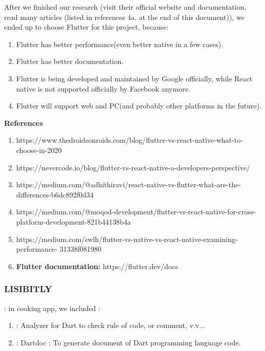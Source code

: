 \documentclass{article}
\begin{document}
After we finished our research (visit their official website and documentation, read many articles (listed in references 4a. at the end of this document)), we ended up to choose Flutter for this project, because:
\begin{enumerate}
        \item Flutter has better performance(even better native in a few cases).
        \item Flutter has better documentation.
        \item Flutter is being developed and maintained by Google officially, while React native is not supported officially by Facebook anymore.
        \item Flutter will support web and PC(and probably other platforms in the future). 
\end{enumerate}

\textbf{References}
\begin{enumerate}
\item https://www.thedroidsonroids.com/blog/flutter-vs-react-native-what-to-choose-in-2020 
\item https://nevercode.io/blog/flutter-vs-react-native-a-developers-perspective/
\item https://medium.com/@adhithiravi/react-native-vs-flutter-what-are-the-differences-b6dc892f0d34
\item https://medium.com/@moqod-development/flutter-vs-react-native-for-cross- platform-development-821b44138b4a
\item https://medium.com/swlh/flutter-vs-native-vs-react-native-examining-performance- 31338f081980
\item \textbf{Flutter documentation: }  https://flutter.dev/docs
\end{enumerate}

 \subsubsection{LISIBITLY} : in cooking app, we included : 
 \begin{enumerate}
 \item : Analyzer for Dart to check rule of code, or comment, v.v...
 \item : Dartdoc : To generate document of Dart programming language code.
 \end{enumerate}
 
\end{document}
